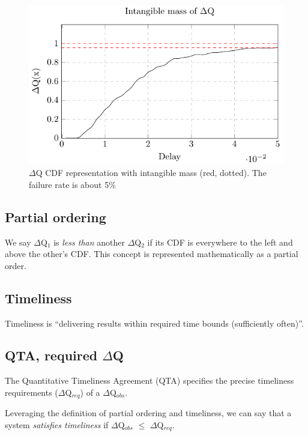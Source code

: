    \begin{figure}[H]
        \begin{center}
            \includegraphics{tikz/intangible.pdf}
        \end{center}
        \caption{$\Delta$Q CDF representation with intangible mass (red, dotted). The failure rate is about 5\% }
        \label{fig:int_mass}
    \end{figure}

    \subsection{Partial ordering}
        We say $\Delta$Q$_1$ is \textit{less than} another $\Delta$Q$_2$ if its CDF is everywhere to the left and above the other's CDF. This concept is represented mathematically as a partial order. \cite{dq-tut} 

    \subsection{Timeliness}
        Timeliness is ``delivering results within required time bounds (sufficiently often)''. \cite{dq-tut}
       
    \subsection{QTA, required $\Delta$Q}
        The Quantitative Timeliness Agreement (QTA) specifies the precise timeliness requirements ($\Delta$Q$_{req}$) of a $\Delta$Q$_{obs}$. \cite{dq-br} \cite{art}

     Leveraging the definition of partial ordering and timeliness, we can say that a system \textit{satisfies timeliness} if $\Delta$Q$_{obs}$ $\le$ $\Delta$Q$_{req}$. \cite{art} 
    

